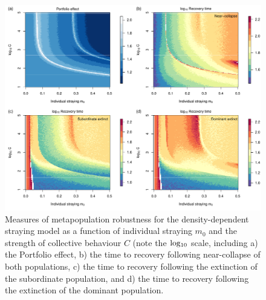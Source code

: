 \documentclass{revtex4}
\begin{document}
\begin{figure}
  \captionsetup{justification=raggedright,
singlelinecheck=false
}
\centering
\includegraphics[width=1\textwidth]{fig_rtpe_ddm.pdf}
\caption{
Measures of metapopulation robustness for the density-dependent straying model as a function of individual straying $m_0$ and the strength of collective behaviour $C$ (note the $\rm log_{10}$ scale, including 
a) the Portfolio effect,
b) the time to recovery following near-collapse of both populations,
c) the time to recovery following the extinction of the subordinate population, and
d) the time to recovery following the extinction of the dominant population.
} \label{fig:pert}
\end{figure}
\end{document}
